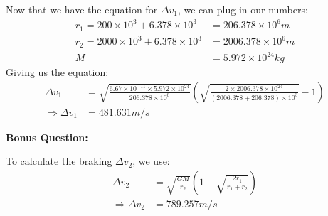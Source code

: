 \documentclass[a4paper, 12pt]{exam}
\begin{document}
		Now that we have the equation for $\Delta v_1$, we can plug in our numbers:
		\begin{equation}
			\begin{split}
				r_1 = 200 \times 10^3 + 6.378 \times 10^3 &= 206.378 \times 10^6 m \\
				r_2 = 2000 \times 10^3 + 6.378 \times 10^3 &= 2006.378 \times 10^6 m \\
				M &= 5.972 \times 10^{24} kg
			\end{split}
		\end{equation} 
		Giving us the equation:
		\begin{equation}
			\begin{split}
				\Delta v_1 &= \sqrt{\frac{6.67 \times 10^{-11}\times 5.972 \times 10^{24}}{206.378 \times 10^6}} \left(\sqrt{\frac{2\times2006.378 \times 10^{24} }{(2006.378+206.378)\times10^3}}-1\right)\\
				\Rightarrow \Delta v_1 &= 481.631 m/s
			\end{split}
		\end{equation}
		
		\textbf{Bonus Question:}
		
		To calculate the braking $\Delta v_2$, we use:
		\begin{equation}
			\begin{split}
				\Delta v_2 &= \sqrt{\frac{GM}{r_2}}\left(1-\sqrt{\frac{2r_1}{r_1+r_2}}\right)\\
				\Rightarrow \Delta v_2 &= 789.257 m/s
			\end{split}
		\end{equation}
		
		\newpage
				
\end{document}
